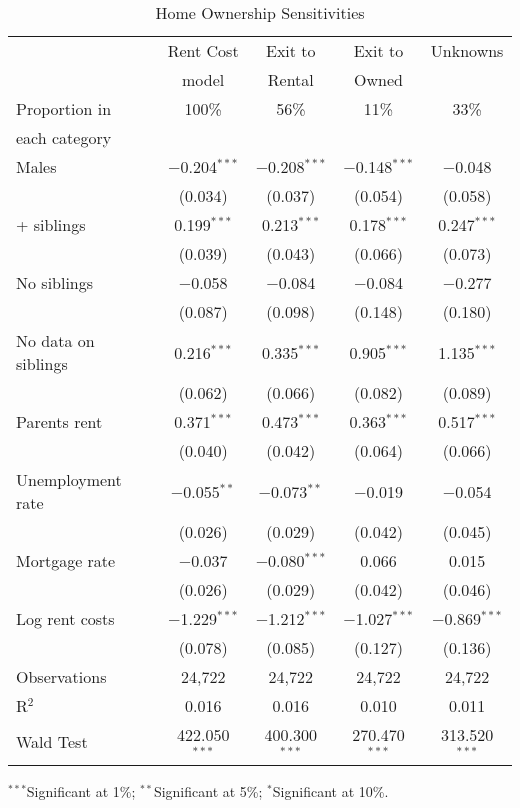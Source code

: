 \documentclass[12pt]{article}
\begin{document}
\begin{table}[htpb] \centering
  \begin{threeparttable}
  \caption{Home Ownership Sensitivities}
  \label{HC_Table}
  \tabularnewline
  \begin{tabular}{@{\extracolsep{1pt}}lcccc}
\toprule
 & Rent Cost & Exit to & Exit to & Unknowns \\
 & model & Rental & Owned & \\
\midrule
Proportion in & 100\% & 56\% & 11\%  & 33\% \\
each category & & & & \\
\addlinespace[0.5em]
 Males & $-$0.204$^{***}$ & $-$0.208$^{***}$ & $-$0.148$^{***}$ & $-$0.048 \\
  & (0.034) & (0.037) & (0.054) & (0.058) \\
\addlinespace[0.5em]
 2+ siblings & 0.199$^{***}$ & 0.213$^{***}$ & 0.178$^{***}$ & 0.247$^{***}$ \\
  & (0.039) & (0.043) & (0.066) & (0.073) \\
\addlinespace[0.5em]
 No siblings & $-$0.058 & $-$0.084 & $-$0.084 & $-$0.277 \\
  & (0.087) & (0.098) & (0.148) & (0.180) \\
\addlinespace[0.5em]
 No data on siblings & 0.216$^{***}$ & 0.335$^{***}$ & 0.905$^{***}$ & 1.135$^{***}$ \\
  & (0.062) & (0.066) & (0.082) & (0.089) \\
\addlinespace[0.5em]
 Parents rent & 0.371$^{***}$ & 0.473$^{***}$ & 0.363$^{***}$ & 0.517$^{***}$ \\
  & (0.040) & (0.042) & (0.064) & (0.066) \\
\addlinespace[0.5em]
 Unemployment rate & $-$0.055$^{**}$ & $-$0.073$^{**}$ & $-$0.019 & $-$0.054 \\
  & (0.026) & (0.029) & (0.042) & (0.045) \\
\addlinespace[0.5em]
 Mortgage rate & $-$0.037 & $-$0.080$^{***}$ & 0.066 & 0.015 \\
  & (0.026) & (0.029) & (0.042) & (0.046) \\
\addlinespace[0.5em]
 Log rent costs & $-$1.229$^{***}$ & $-$1.212$^{***}$ & $-$1.027$^{***}$ & $-$0.869$^{***}$ \\
  & (0.078) & (0.085) & (0.127) & (0.136) \\
\addlinespace[0.5em]
Observations & 24,722 & 24,722 & 24,722 & 24,722 \\
R$^{2}$ & 0.016 & 0.016 & 0.010 & 0.011 \\
Wald Test & 422.050$^{***}$ & 400.300$^{***}$ & 270.470$^{***}$ & 313.520$^{***}$ \\
\bottomrule
\end{tabular}
\begin{tablenotes}[flushleft]
  \item $^{***}$Significant at 1\%; $^{**}$Significant at 5\%; $^{*}$Significant at 10\%.
\end{tablenotes}
\end{threeparttable}
\end{table}
\end{document}
